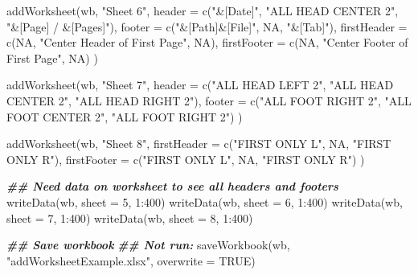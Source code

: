 \documentclass[
]{book}
\newenvironment{Shaded}{\begin{snugshade}}{\end{snugshade}}
\newcommand{\AttributeTok}[1]{\textcolor[rgb]{0.77,0.63,0.00}{#1}}
\newcommand{\ConstantTok}[1]{\textcolor[rgb]{0.00,0.00,0.00}{#1}}
\newcommand{\DecValTok}[1]{\textcolor[rgb]{0.00,0.00,0.81}{#1}}
\newcommand{\DocumentationTok}[1]{\textcolor[rgb]{0.56,0.35,0.01}{\textbf{\textit{#1}}}}
\newcommand{\FunctionTok}[1]{\textcolor[rgb]{0.00,0.00,0.00}{#1}}
\newcommand{\NormalTok}[1]{#1}
\newcommand{\SpecialCharTok}[1]{\textcolor[rgb]{0.00,0.00,0.00}{#1}}
\newcommand{\StringTok}[1]{\textcolor[rgb]{0.31,0.60,0.02}{#1}}
\begin{document}
\begin{Shaded}
\begin{Highlighting}[]
\FunctionTok{addWorksheet}\NormalTok{(wb, }\StringTok{"Sheet 6"}\NormalTok{,}
  \AttributeTok{header =} \FunctionTok{c}\NormalTok{(}\StringTok{"\&[Date]"}\NormalTok{, }\StringTok{"ALL HEAD CENTER 2"}\NormalTok{, }\StringTok{"\&[Page] / \&[Pages]"}\NormalTok{),}
  \AttributeTok{footer =} \FunctionTok{c}\NormalTok{(}\StringTok{"\&[Path]\&[File]"}\NormalTok{, }\ConstantTok{NA}\NormalTok{, }\StringTok{"\&[Tab]"}\NormalTok{),}
  \AttributeTok{firstHeader =} \FunctionTok{c}\NormalTok{(}\ConstantTok{NA}\NormalTok{, }\StringTok{"Center Header of First Page"}\NormalTok{, }\ConstantTok{NA}\NormalTok{),}
  \AttributeTok{firstFooter =} \FunctionTok{c}\NormalTok{(}\ConstantTok{NA}\NormalTok{, }\StringTok{"Center Footer of First Page"}\NormalTok{, }\ConstantTok{NA}\NormalTok{)}
\NormalTok{)}

\FunctionTok{addWorksheet}\NormalTok{(wb, }\StringTok{"Sheet 7"}\NormalTok{,}
  \AttributeTok{header =} \FunctionTok{c}\NormalTok{(}\StringTok{"ALL HEAD LEFT 2"}\NormalTok{, }\StringTok{"ALL HEAD CENTER 2"}\NormalTok{, }\StringTok{"ALL HEAD RIGHT 2"}\NormalTok{),}
  \AttributeTok{footer =} \FunctionTok{c}\NormalTok{(}\StringTok{"ALL FOOT RIGHT 2"}\NormalTok{, }\StringTok{"ALL FOOT CENTER 2"}\NormalTok{, }\StringTok{"ALL FOOT RIGHT 2"}\NormalTok{)}
\NormalTok{)}

\FunctionTok{addWorksheet}\NormalTok{(wb, }\StringTok{"Sheet 8"}\NormalTok{,}
  \AttributeTok{firstHeader =} \FunctionTok{c}\NormalTok{(}\StringTok{"FIRST ONLY L"}\NormalTok{, }\ConstantTok{NA}\NormalTok{, }\StringTok{"FIRST ONLY R"}\NormalTok{),}
  \AttributeTok{firstFooter =} \FunctionTok{c}\NormalTok{(}\StringTok{"FIRST ONLY L"}\NormalTok{, }\ConstantTok{NA}\NormalTok{, }\StringTok{"FIRST ONLY R"}\NormalTok{)}
\NormalTok{)}

\DocumentationTok{\#\# Need data on worksheet to see all headers and footers}
\FunctionTok{writeData}\NormalTok{(wb, }\AttributeTok{sheet =} \DecValTok{5}\NormalTok{, }\DecValTok{1}\SpecialCharTok{:}\DecValTok{400}\NormalTok{)}
\FunctionTok{writeData}\NormalTok{(wb, }\AttributeTok{sheet =} \DecValTok{6}\NormalTok{, }\DecValTok{1}\SpecialCharTok{:}\DecValTok{400}\NormalTok{)}
\FunctionTok{writeData}\NormalTok{(wb, }\AttributeTok{sheet =} \DecValTok{7}\NormalTok{, }\DecValTok{1}\SpecialCharTok{:}\DecValTok{400}\NormalTok{)}
\FunctionTok{writeData}\NormalTok{(wb, }\AttributeTok{sheet =} \DecValTok{8}\NormalTok{, }\DecValTok{1}\SpecialCharTok{:}\DecValTok{400}\NormalTok{)}

\DocumentationTok{\#\# Save workbook}
\DocumentationTok{\#\# Not run: }
\FunctionTok{saveWorkbook}\NormalTok{(wb, }\StringTok{"addWorksheetExample.xlsx"}\NormalTok{, }\AttributeTok{overwrite =} \ConstantTok{TRUE}\NormalTok{)}
\end{Highlighting}
\end{Shaded}
\end{document}
